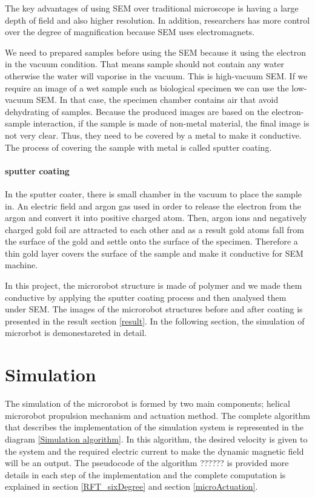 \documentclass[12pt,a4paper,titlepage]{report}
\begin{document}
The key advantages of using \ac*{SEM} over traditional microscope is having a large depth of
 field and also higher resolution. In addition, researchers has more control over the degree of 
magnification because \ac*{SEM} uses electromagnets\citep{Doe:2014Jan:Online}.

We need to prepared samples before using the \ac{SEM} because it using the electron in the
 vacuum condition. That means sample should not contain any water otherwise the water will 
vaporise in the vacuum. This is high-vacuum \ac*{SEM}. If we require an image of a wet sample such 
as biological specimen we can use the low-vacuum \ac*{SEM}. In that case, the specimen chamber
 contains air that avoid dehydrating of samples.
Because the produced images are based on the electron-sample interaction, if the sample is made
 of non-metal material, the final image is not very clear. Thus, they need to be covered by a metal to
 make it conductive. The process of covering the sample with metal is called sputter coating\citep{Doe:2014Jan:Online}.

\paragraph{sputter coating}
In the sputter coater, there is small chamber in the vacuum to place the sample in. An electric field 
and argon gas used in order to release the electron from the argon and convert it into positive charged 
atom. Then, argon ions and negatively charged gold foil are attracted to each other and as a result gold 
atoms fall from the surface of the gold and settle onto the surface of the specimen. Therefore a thin gold 
layer covers the surface of the sample and make it conductive for \ac*{SEM} machine\citep{Doe:2014Jan:Online}.

In this project, the microrobot structure is made of polymer and we made them conductive by applying the 
sputter coating process and then analysed them under \ac*{SEM}. The images of the microrobot structures 
before and after coating is presented in the result section \ref{result}. In the following section, the simulation of 
microrbot is demonestareted in detail.



\section{Simulation}\label{simulation}
The simulation of the microrobot is formed by two main components; helical microrobot propulsion mechanism
 and actuation method. The complete algorithm that describes the implementation of the simulation
system is represented in the diagram \ref{Simulation algorithm}. In this algorithm, the desired velocity is given to the system
and the required electric current to make the dynamic magnetic field will be an output. The pseudocode of
the algorithm ?????? is provided more details in each step of the implementation and the complete computation
is explained in section \ref{RFT_sixDegree} and section \ref{microActuation}.    
\end{document}
